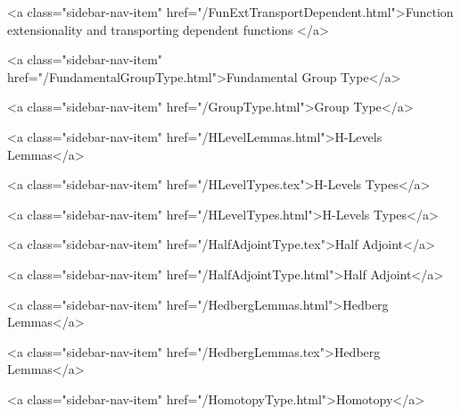       
    
      
        
          <a class="sidebar-nav-item" href="/FunExtTransportDependent.html">Function extensionality and transporting dependent functions </a>
        
      
    
      
        
          <a class="sidebar-nav-item" href="/FundamentalGroupType.html">Fundamental Group Type</a>
        
      
    
      
        
          <a class="sidebar-nav-item" href="/GroupType.html">Group Type</a>
        
      
    
      
        
          <a class="sidebar-nav-item" href="/HLevelLemmas.html">H-Levels Lemmas</a>
        
      
    
      
        
          <a class="sidebar-nav-item" href="/HLevelTypes.tex">H-Levels Types</a>
        
      
    
      
        
          <a class="sidebar-nav-item" href="/HLevelTypes.html">H-Levels Types</a>
        
      
    
      
        
          <a class="sidebar-nav-item" href="/HalfAdjointType.tex">Half Adjoint</a>
        
      
    
      
        
          <a class="sidebar-nav-item" href="/HalfAdjointType.html">Half Adjoint</a>
        
      
    
      
        
          <a class="sidebar-nav-item" href="/HedbergLemmas.html">Hedberg Lemmas</a>
        
      
    
      
        
          <a class="sidebar-nav-item" href="/HedbergLemmas.tex">Hedberg Lemmas</a>
        
      
    
      
        
          <a class="sidebar-nav-item" href="/HomotopyType.html">Homotopy</a>
        
